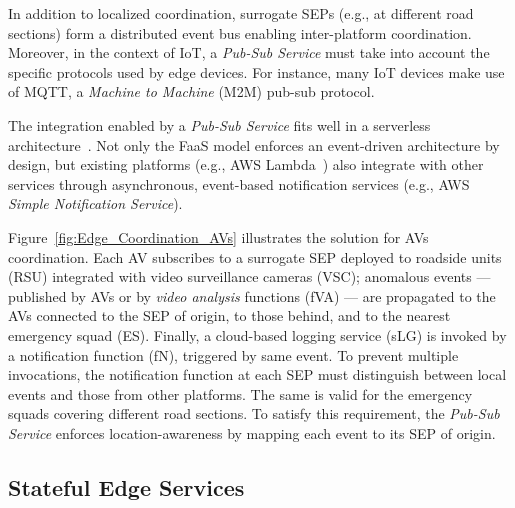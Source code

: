 In addition to localized coordination, surrogate SEPs (e.g., at different road sections) form a distributed event bus enabling inter-platform coordination. Moreover, in the context of IoT, a \textit{Pub-Sub Service} must take into account the specific protocols used by edge devices. For instance, many IoT devices make use of MQTT, a \textit{Machine to Machine} (M2M) pub-sub protocol. 

The integration enabled by a \textit{Pub-Sub Service} fits well in a serverless architecture~\cite{Lloyd18serverless}. Not only the FaaS model enforces an event-driven architecture by design, but existing platforms (e.g., AWS Lambda~\cite{AWSLambda}) also integrate with other services through asynchronous, event-based notification services (e.g., AWS \textit{Simple Notification Service}). 



Figure~\ref{fig:Edge_Coordination_AVs} illustrates the solution for AVs coordination. Each AV subscribes to a surrogate SEP deployed to roadside units (RSU) integrated with video surveillance cameras (VSC); anomalous events --- published by AVs or by \textit{video analysis} functions (fVA) --- are propagated to the AVs connected to the SEP of origin, to those behind, and to the nearest emergency squad (ES). Finally, a cloud-based logging service (sLG) is invoked by a notification function (fN), triggered by same event. To prevent multiple invocations, the notification function at each SEP must distinguish between local events and those from other platforms. The same is valid for the emergency squads covering different road sections. To satisfy this requirement, the \textit{Pub-Sub Service} enforces location-awareness by mapping each event to its SEP of origin.

\subsection{Stateful Edge Services}

